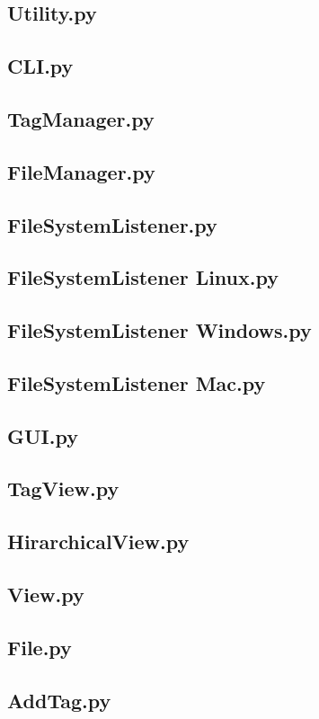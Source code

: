 \documentclass[10pt,paper=a4,final]{scrartcl}
\begin{document}
\subsection{Utility.py}

\subsection{CLI.py}

\subsection{TagManager.py}

\subsection{FileManager.py}

\subsection{FileSystemListener.py}

\subsection{FileSystemListener Linux.py}

\subsection{FileSystemListener Windows.py}

\subsection{FileSystemListener Mac.py}

\subsection{GUI.py}

\subsection{TagView.py}

\subsection{HirarchicalView.py}

\subsection{View.py}

\subsection{File.py}

\subsection{AddTag.py}

\end{document}
